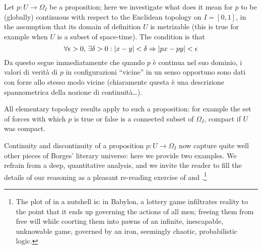 \begin{remark}\label{continuiti}
	Let $p : U \to \Omega_I$ be a proposition; here we investigate what does it mean for $p$ to be (globally) continuous with respect to the Euclidean topology on $I=[0,1]$, in the assumption that its domain of definition $U$ is metrizable (this is true for example when $U$ is a subset of space-time). The condition is that
	\[ \forall \epsilon > 0,\,\exists \delta > 0 : |x-y|< \delta \Rightarrow |px-py| < \epsilon \]
	Da questo segue immediatamente che quando $p$ è continua nel suo dominio, i valori di verità di $p$ in configurazioni ``vicine'' in un senso opportuno sono dati con forze allo stesso modo vicine (chiaramente questa è una descrizione spannometrica della nozione di continuità\dots).

	All elementary topology results apply to such a proposition: for example the set of forces with which $p$ is true or false is a connected subset of $\Omega_I$, compact if $U$ was compact.
\end{remark}
Continuity and discontinuity of a proposition $p : U \to \Omega_I$ now capture quite well other pieces of Borges' literary universe: here we provide two examples. We refrain from a deep, quantitative analysis, and we invite the reader to fill the details of our reasoning as a pleasant re-reading exercise of \cite{babil} and \cite{tlonEN}.\footnote{The plot of \cite{babil} in a nutshell is: in Babylon, a lottery game infiltrates reality to the point that it ends up governing the actions of all men; freeing them from free will while coorting them into pawns of an infinite, inescapable, unknowable game, governed by an iron, seemingly chaotic, probabilistic logic.}
